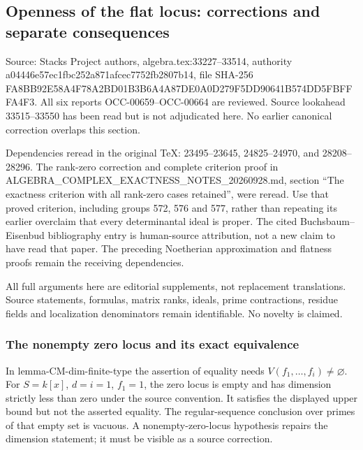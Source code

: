 \subsection{Openness of the flat locus: corrections and separate consequences}\label{algebra-proof-039-openness-of-the-flat-locus-corrections-and-separate-consequences}

Source: Stacks Project authors, algebra.tex:33227--33514, authority a044\allowbreak{}46e5\allowbreak{}7ec1\allowbreak{}fbc2\allowbreak{}52a8\allowbreak{}71af\allowbreak{}cec7\allowbreak{}752f\allowbreak{}b280\allowbreak{}7b14, file SHA-256 FA8B\allowbreak{}B92E\allowbreak{}58A4\allowbreak{}F78A\allowbreak{}2BD0\allowbreak{}1B3B\allowbreak{}6A4A\allowbreak{}87DE\allowbreak{}0A0D\allowbreak{}279F\allowbreak{}5DD9\allowbreak{}0641\allowbreak{}B574\allowbreak{}DD5F\allowbreak{}BFFF\allowbreak{}A4F3. All six reports OCC-00659--OCC-00664 are reviewed. Source lookahead 33515--33550 has been read but is not adjudicated here. No earlier canonical correction overlaps this section.

Dependencies reread in the original TeX: 23495--23645, 24825--24970, and 28208--28296. The rank-zero correction and complete criterion proof in ALGEBRA\_\allowbreak{}COMPLEX\_\allowbreak{}EXACTNESS\_\allowbreak{}NOTES\_\allowbreak{}20260928.\allowbreak{}md, section ``The exactness criterion with all rank-zero cases retained'', were reread. Use that proved criterion, including groups 572, 576 and 577, rather than repeating its earlier overclaim that every determinantal ideal is proper. The cited Buchsbaum--Eisenbud bibliography entry is human-source attribution, not a new claim to have read that paper. The preceding Noetherian approximation and flatness proofs remain the receiving dependencies.

All full arguments here are editorial supplements, not replacement translations. Source statements, formulas, matrix ranks, ideals, prime contractions, residue fields and localization denominators remain identifiable. No novelty is claimed.

\subsubsection{The nonempty zero locus and its exact equivalence}\label{algebra-proof-039-the-nonempty-zero-locus-and-its-exact-equivalence}

In lemma-CM-dim-finite-type the assertion of equality needs \(V(f_1,\ldots,f_i)\ne\varnothing\). For \(S=k[x]\), \(d=i=1\), \(f_1=1\), the zero locus is empty and has dimension strictly less than zero under the source convention. It satisfies the displayed upper bound but not the asserted equality. The regular-sequence conclusion over primes of that empty set is vacuous. A nonempty-zero-locus hypothesis repairs the dimension statement; it must be visible as a source correction.


